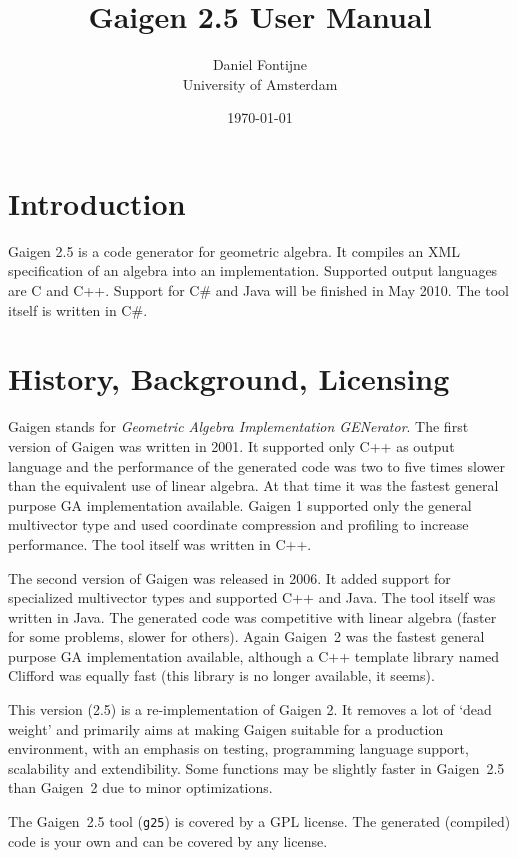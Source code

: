 \documentclass[10pt, a4paper]{article}
\begin{document}
\title{Gaigen 2.5 User Manual}
\author{
Daniel Fontijne\\University of Amsterdam 
}
\date{\today}
\maketitle

\section{Introduction}

Gaigen 2.5 is a code generator for geometric algebra. It compiles an XML specification
of an algebra into an implementation. Supported output languages are C and C++.
Support for C\# and Java will be finished in May 2010. The tool itself is written in C\#.

\section{History, Background, Licensing}

Gaigen stands for \emph{Geometric Algebra Implementation GENerator}.
The first version of Gaigen was written in 2001. It supported only C++ as output language
and the performance of the generated code was two to five times slower than the equivalent
use of linear algebra. At that time it was the fastest general purpose GA implementation available. 
Gaigen 1 supported only the general multivector type and used coordinate  compression and profiling 
to increase performance. The tool itself was written in C++.

The second version of Gaigen was released in 2006. It added support for specialized multivector
types and supported C++ and Java. The tool itself was written in Java.
The generated code was competitive with linear algebra (faster for some problems, slower for others).
Again Gaigen~2 was the fastest general purpose GA implementation available, although a 
C++ template library named Clifford was equally fast (this library is no longer available,
it seems).

This version (2.5) is a re-implementation of Gaigen 2. It removes a lot of `dead weight' and
primarily aims at making Gaigen suitable for a production environment, with an emphasis on
testing, programming language support, scalability and extendibility. Some functions may be
slightly faster in Gaigen~2.5 than Gaigen~2 due to minor optimizations.

The Gaigen~2.5 tool ({\tt g25}) is covered by a GPL license. 
The generated (compiled) code is your own and can be covered by any license.
\end{document}
